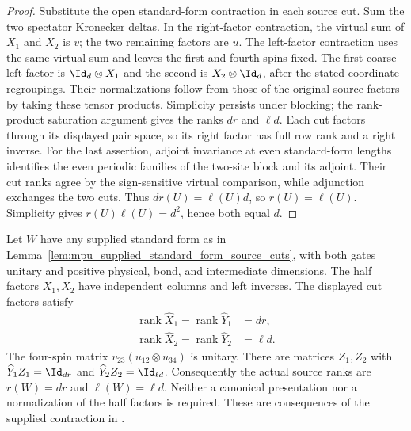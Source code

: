 \begin{proof}\leanok
    Substitute the open standard-form contraction in each source cut.
    Sum the two spectator Kronecker deltas. In the right-factor contraction,
    the virtual sum of $X_1$ and $X_2$ is $v$; the two remaining factors are
    $u$. The left-factor contraction uses the same virtual sum and leaves
    the first and fourth spins fixed. The first coarse left factor is
    $\Id_d\otimes X_1$ and the second is $X_2\otimes\Id_d$, after
    the stated coordinate regroupings. Their normalizations follow from
    those of the original source factors by taking these tensor products.
    Simplicity persists under blocking; the rank-product saturation argument
    gives the ranks $dr$ and $\ell d$. Each cut factors through its displayed
    pair space, so its right factor has full row rank and a right inverse.
    For the last assertion, adjoint invariance at even standard-form lengths
    identifies the even periodic families of the two-site block and its
    adjoint. Their cut ranks agree by the sign-sensitive virtual comparison, while
    adjunction exchanges the two cuts. Thus $dr(U)=\ell(U)d$, so
    $r(U)=\ell(U)$. Simplicity gives $r(U)\ell(U)=d^2$, hence both equal $d$.
\end{proof}

\begin{lemma}
    \label{lem:mpu_supplied_half_factor_minimality}
    \leanok
    Let $W$ have any supplied standard form as in
    Lemma~\ref{lem:mpu_supplied_standard_form_source_cuts}, with both gates
    unitary and positive physical, bond, and intermediate dimensions.
    The half factors $X_1,X_2$ have independent columns and left inverses.
    The displayed cut factors satisfy
    \begin{align}
        \operatorname{rank}\widehat X_1
        =\operatorname{rank}\widehat Y_1 & =dr,     \\
        \operatorname{rank}\widehat X_2
        =\operatorname{rank}\widehat Y_2 & =\ell d.
    \end{align}
    The four-spin matrix $v_{23}(u_{12}\otimes u_{34})$ is unitary.
    There are matrices $Z_1,Z_2$ with
    $\widehat Y_1Z_1=\Id_{dr}$ and $\widehat Y_2Z_2=\Id_{\ell d}$.
    Consequently the actual source ranks are $r(W)=dr$ and
    $\ell(W)=\ell d$. Neither a canonical presentation nor a normalization
    of the half factors is required. These are consequences of the supplied
    contraction in \cite[lines~532--543, 603--617 and
        1237--1244]{Cirac2017MPU}.
\end{lemma}

